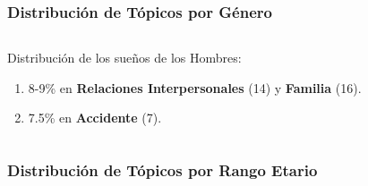 \documentclass{beamer}
\begin{document}
\begin{frame}
\frametitle{Distribución de Tópicos por Género}
\begin{columns}
\begin{column}{0.6\textwidth}
Distribución de los sueños de los Hombres:
\begin{enumerate}
    \item 8-9\% en \textbf{Relaciones Interpersonales} (14) y \textbf{Familia} (16).
    \item 7.5\% en \textbf{Accidente} (7).
\end{enumerate}
\end{column}
\begin{column}{0.4\textwidth}
\end{column}
\end{columns}
\end{frame}

\begin{frame}
\frametitle{Distribución de Tópicos por Rango Etario}

\end{frame}
\end{document}
